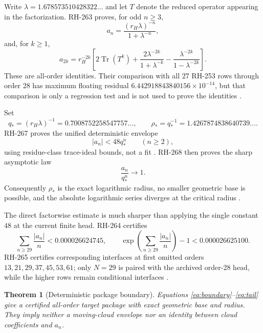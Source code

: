 \documentclass[11pt]{article}
\newtheorem{theorem}{Theorem}[section]
\theoremstyle{remark}
\newcommand{\Tr}{\operatorname{Tr}}
\begin{document}
Write $\lambda=1.678573510428322\ldots$ and let $T$ denote the reduced
operator appearing in the factorization.  RH-263 proves, for odd $n\ge3$,
\begin{equation}
 a_n=\frac{(r_H\lambda)^{-n}}{1+\lambda^{-n}},
 \label{eq:odd}
\end{equation}
and, for $k\ge1$,
\begin{equation}
 a_{2k}=r_H^{-2k}\left[
 2\Tr(T^k)+\frac{2\lambda^{-2k}}{1+\lambda^{-k}}
 -\frac{\lambda^{-2k}}{1-\lambda^{-2k}}
 \right].
 \label{eq:even}
\end{equation}
These are all-order identities.  Their comparison with all 27 RH-253 rows
through order 28 has maximum floating residual
$6.442918843840156\times10^{-14}$, but that comparison is only a regression
test and is not used to prove the identities \citep{WangRH263}.

Set
\begin{equation}
 q_*=(r_H\lambda)^{-1}=0.7008752258547757\ldots,
 \qquad
 \rho_*=q_*^{-1}=1.4267874838640739\ldots .
 \label{eq:qstar}
\end{equation}
RH-267 proves the unified deterministic envelope
\begin{equation}
 |a_n|<48q_*^n\qquad(n\ge2),
 \label{eq:envelope}
\end{equation}
using residue-class trace-ideal bounds, not a fit \citep{WangRH267}.  RH-268
then proves the sharp asymptotic law
\begin{equation}
 \frac{a_n}{q_*^n}\longrightarrow1.
 \label{eq:sharp}
\end{equation}
Consequently $\rho_*$ is the exact logarithmic radius, no smaller geometric
base is possible, and the absolute logarithmic series diverges at the
critical radius \citep{WangRH268}.

The direct factorwise estimate is much sharper than applying the single
constant $48$ at the current finite head.  RH-264 certifies
\begin{equation}
 \sum_{n\ge29}\frac{|a_n|}{n}<0.000026624745,
 \qquad
 \exp\!\left(\sum_{n\ge29}\frac{|a_n|}{n}\right)-1
 <0.000026625100.
 \label{eq:tail}
\end{equation}
RH-265 certifies corresponding interfaces at first omitted orders
$13,21,29,37,45,53,61$; only $N=29$ is paired with the archived order-28
head, while the higher rows remain conditional interfaces
\citep{WangRH264,WangRH265}.

\begin{theorem}[Deterministic package boundary]
Equations \eqref{eq:boundary}--\eqref{eq:tail} give a certified all-order
target package with exact geometric base and radius.  They imply neither a
moving-cloud envelope nor an identity between cloud coefficients and $a_n$.
\end{theorem}
\end{document}

